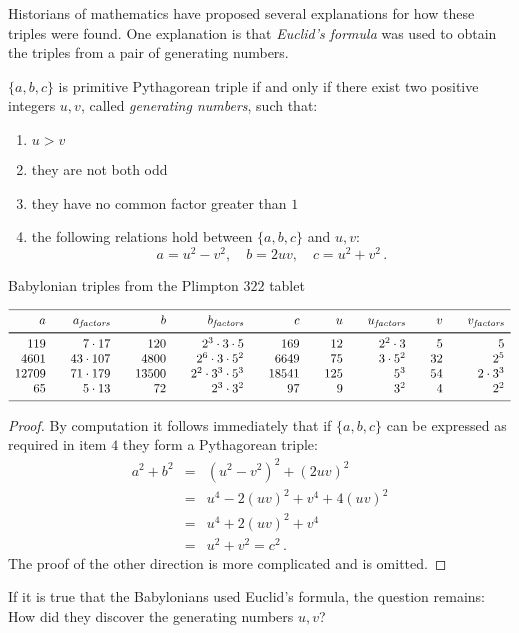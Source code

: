 Historians of mathematics have proposed several explanations for how these triples were found. One explanation is that \emph{Euclid's formula} was used to obtain the triples from a pair of generating numbers.
\begin{theorem}[Euclid]
$\{a,b,c\}$ is primitive Pythagorean triple if and only if there exist two positive integers $u,v$, called \emph{generating numbers}, such that:\label{thm.euclid-function}
\begin{enumerate}
\item $u>v$
\item they are not both odd
\item they have no common factor greater than $1$
\item the following relations hold between $\{a,b,c\}$ and $u,v$:
\[
a=u^2-v^2,\quad b=2uv,\quad c=u^2+v^2\,.
\]
\end{enumerate}
\end{theorem}

\begin{table}[t]
\caption{Babylonian triples from the Plimpton $322$ tablet}\label{t.babylonian}
\[
\begin{array}{r@{$\quad\quad$}r@{$\quad\quad$}r@{$\quad\quad$}r@{$\quad\quad$}r@{$\quad\quad$}r@{$\quad\quad$}r@{$\quad\quad$}r@{$\quad\quad$}r}
\hline
\noalign{\smallskip}
a&a_{\textit{factors}}&b&b_{\textit{factors}}&c&u&u_{\textit{factors}}&v&v_{\textit{factors}}\\
\noalign{\smallskip}\svhline\noalign{\smallskip}
119&7\cdot 17 &120&2^3 \cdot 3\cdot 5 & 169&12&2^2\cdot 3&5&5\\
4601 &43\cdot 107&4800&2^6 \cdot 3 \cdot 5^2& 6649&75&3\cdot 5^2&32&2^5\\
12709 &71\cdot 179&13500&2^2 \cdot 3^3 \cdot 5^3& 18541&125&5^3&54&2\cdot 3^3\\
65 &5\cdot 13&72&2^3 \cdot 3^2 & 97&9&3^2&4&2^2\\
\noalign{\smallskip}\hline
\end{array}
\]
\end{table}

\begin{proof}
By computation it follows immediately that if $\{a,b,c\}$ can be expressed as required in item $4$ they form a Pythagorean triple:
\begin{eqnarray*}
a^2+b^2&=&(u^2-v^2)^2 + (2uv)^2\\
&=& u^4-2(uv)^2+v^4+4(uv)^2\\
&=&u^4+2(uv)^2+v^4\\
&=&u^2+v^2=c^2\,.
\end{eqnarray*}
The proof of the other direction is more complicated and is omitted.
\end{proof}
If it is true that the Babylonians used Euclid's formula, the question remains: How did they discover the generating numbers $u,v$?

